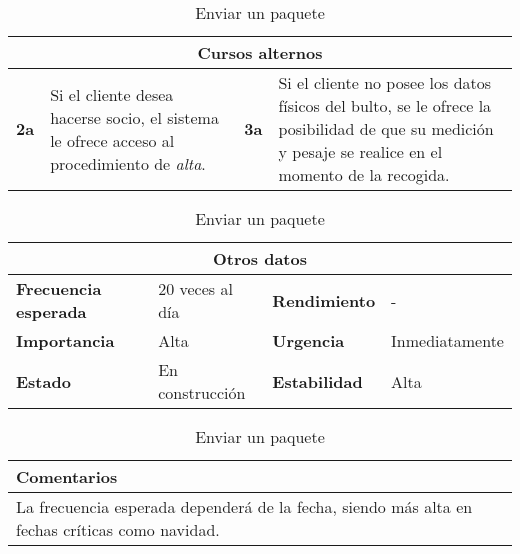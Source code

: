 \begin{table}[H]
\vspace{1cm}

\begin{tabular}{|m{10pt}|m{7.15cm}|m{10pt}|m{7.15cm}|}
\hline
\multicolumn{4}{|c|}{\textbf{Cursos alternos}} \\
\hline
\textbf{2a} & Si el cliente desea hacerse socio, el sistema le ofrece acceso al procedimiento de \emph{alta}. & \textbf{3a} & Si el cliente no posee los datos físicos del bulto, se le ofrece la posibilidad de que su medición y pesaje se realice en el momento de la recogida.  \\
\hline
\end{tabular}

\vspace{1cm}

\begin{tabular}{|m{3.72cm}|m{3.72cm}|m{3.72cm}|m{3.72cm}|}
\hline
\multicolumn{4}{|c|}{\textbf{Otros datos}} \\
\hline
\textbf{Frecuencia esperada} & 20 veces al día & \textbf{Rendimiento} & - \\
\hline
\textbf{Importancia} & Alta & \textbf{Urgencia} & Inmediatamente \\
\hline
\textbf{Estado} & En construcción & \textbf{Estabilidad} & Alta \\
\hline
\end{tabular}

\vspace{1cm}

\begin{tabular}{|m{16.2cm}|}
\hline
\textbf{Comentarios} \\
\hline
La frecuencia esperada dependerá de la fecha, siendo más alta en fechas críticas como navidad. \\
\hline
\end{tabular}

\caption{Enviar un paquete}

\end{table}



